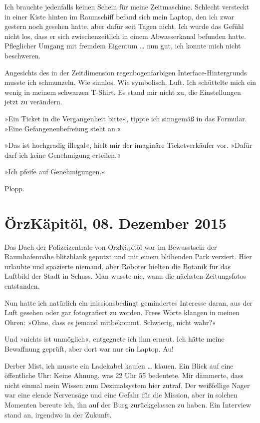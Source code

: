 Ich brauchte jedenfalls keinen Schein für meine Zeitmaschine. Schlecht versteckt in einer Kiste hinten im Raumschiff befand sich mein Laptop, den ich zwar gestern noch gesehen hatte, aber dafür seit Tagen nicht. Ich wurde das Gefühl nicht los, dass er sich zwischenzeitlich in einem Abwasserkanal befunden hatte. Pfleglicher Umgang mit fremdem Eigentum … nun gut, ich konnte mich nicht beschweren.

Angesichts des in der Zeitdimension regenbogenfarbigen Interface-Hintergrunds musste ich schmunzeln. Wie sinnlos. Wie symbolisch. Luft. Ich schüttelte mich ein wenig in meinem schwarzen T-Shirt. Es stand mir nicht zu, die Einstellungen jetzt zu verändern.

»Ein Ticket in die Vergangenheit bitte«, tippte ich sinngemäß in das Formular. »Eine Gefangenenbefreiung steht an.«

»Das ist hochgradig illegal«, hielt mir der imaginäre Ticketverkäufer vor. »Dafür darf ich keine Genehmigung erteilen.«

»Ich pfeife auf Genehmigungen.«

Plopp.


\chapter{ÖrzKäpitöl, 08. Dezember 2015}

Das Dach der Polizeizentrale von ÖrzKäpitöl war im Bewusstsein der Raumhafennähe blitzblank geputzt und mit einem blühenden Park verziert. Hier urlaubte und spazierte niemand, aber Roboter hielten die Botanik für das Luftbild der Stadt in Schuss. Man wusste nie, wann die nächsten Zeitungsfotos entstanden.

Nun hatte ich natürlich ein missionsbedingt gemindertes Interesse daran, aus der Luft gesehen oder gar fotografiert zu werden. Frees Worte klangen in meinen Ohren: »Ohne, dass es jemand mitbekommt. Schwierig, nicht wahr?«

Und »nichts ist unmöglich«, entgegnete ich ihm erneut. Ich hätte meine Bewaffnung geprüft, aber dort war nur ein Laptop. Au!


Derber Mist, ich musste ein Ladekabel kaufen … klauen. Ein Blick auf eine öffentliche Uhr: Keine Ahnung, was 22 Uhr 55 bedeutete. Mir dämmerte, dass nicht einmal mein Wissen zum Dezimalsystem hier zutraf. Der weißfellige Nager war eine elende Nervensäge und eine Gefahr für die Mission, aber in solchen Momenten bereute ich, ihn auf der Burg zurückgelassen zu haben. Ein Interview stand an, irgendwo in der Zukunft.

